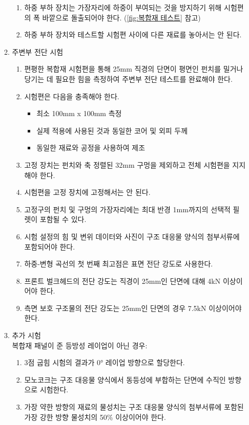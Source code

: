 \documentclass[final,a4paper,10pt]{report}
\begin{document}
\begin{enumerate}
\begin{enumerate}
\begin{enumerate}
          \item 하중 부하 장치는 가장자리에 하중이 부여되는 것을 방지하기 위해 시험편의 폭 바깥으로 돌출되어야 한다. (\cref{fig:복합재 테스트} 참고)
          \item 하중 부하 장치와 테스트할 시험편 사이에 다른 재료를 놓아서는 안 된다.
        \end{enumerate}

      \item 주변부 전단 시험
        \begin{enumerate}
          \item 편평한 복합재 시험편을 통해 25mm 직경의 단면이 평면인 펀치를 밀거나 당기는 데 필요한 힘을 측정하여 주변부 전단 테스트를 완료해야 한다.
          
          \item 시험편은 다음을 충족해야 한다.
            \begin{itemize}
                \item 최소 100mm x 100mm 측정
                \item 실제 적용에 사용된 것과 동일한 코어 및 외피 두께
                \item 동일한 재료와 공정을 사용하여 제조
            \end{itemize}
            
          \item 고정 장치는 펀치와 축 정렬된 32mm 구멍을 제외하고 전체 시험편을 지지해야 한다.
          \item 시험편을 고정 장치에 고정해서는 안 된다.
          \item 고정구의 펀치 및 구멍의 가장자리에는 최대 반경 1mm까지의 선택적 필렛이 포함될 수 있다.
          \item 시험 설정의 힘 및 변위 데이터와 사진이 구조 대응물 양식의 첨부서류에 포함되어야 한다.
          \item 하중-변형 곡선의 첫 번째 최고점은 표면 전단 강도로 사용한다.
          \item 프론트 벌크헤드의 전단 강도는 직경이 25mm인 단면에 대해 4kN 이상이어야 한다.
          \item 측면 보호 구조물의 전단 강도는 25mm인 단면의 경우 7.5kN 이상이어야 한다.
        \end{enumerate}

      \item 추가 시험\\
        복합재 패널이 준 등방성 레이업이 아닌 경우: 
        \begin{enumerate}
          \item 3점 굽힘 시험의 결과가 0° 레이업 방향으로 할당한다.
          \item 모노코크는 구조 대응물 양식에서 동등성에 부합하는 단면에 수직인 방향으로 시험한다.
          \item 가장 약한 방향의 재료의 물성치는 구조 대응물 양식의 첨부서류에 포함된 가장 강한 방향 물성치의 50\% 이상이어야 한다.
        \end{enumerate}


\end{enumerate}
\end{enumerate}
\end{document}

